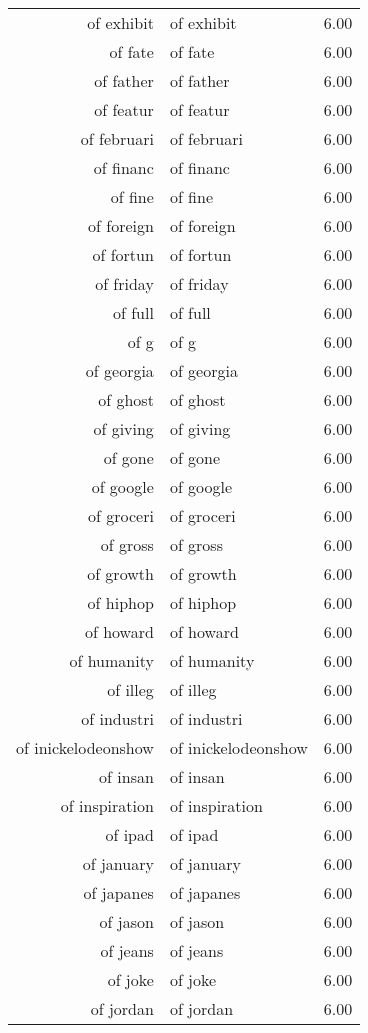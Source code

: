 \begin{table}[ht]
\begin{tabular}{rlr}
  of exhibit & of exhibit & 6.00 \\ 
  of fate & of fate & 6.00 \\ 
  of father & of father & 6.00 \\ 
  of featur & of featur & 6.00 \\ 
  of februari & of februari & 6.00 \\ 
  of financ & of financ & 6.00 \\ 
  of fine & of fine & 6.00 \\ 
  of foreign & of foreign & 6.00 \\ 
  of fortun & of fortun & 6.00 \\ 
  of friday & of friday & 6.00 \\ 
  of full & of full & 6.00 \\ 
  of g & of g & 6.00 \\ 
  of georgia & of georgia & 6.00 \\ 
  of ghost & of ghost & 6.00 \\ 
  of giving & of giving & 6.00 \\ 
  of gone & of gone & 6.00 \\ 
  of google & of google & 6.00 \\ 
  of groceri & of groceri & 6.00 \\ 
  of gross & of gross & 6.00 \\ 
  of growth & of growth & 6.00 \\ 
  of hiphop & of hiphop & 6.00 \\ 
  of howard & of howard & 6.00 \\ 
  of humanity & of humanity & 6.00 \\ 
  of illeg & of illeg & 6.00 \\ 
  of industri & of industri & 6.00 \\ 
  of inickelodeonshow & of inickelodeonshow & 6.00 \\ 
  of insan & of insan & 6.00 \\ 
  of inspiration & of inspiration & 6.00 \\ 
  of ipad & of ipad & 6.00 \\ 
  of january & of january & 6.00 \\ 
  of japanes & of japanes & 6.00 \\ 
  of jason & of jason & 6.00 \\ 
  of jeans & of jeans & 6.00 \\ 
  of joke & of joke & 6.00 \\ 
  of jordan & of jordan & 6.00 \\ 

\end{tabular}
\end{table}
